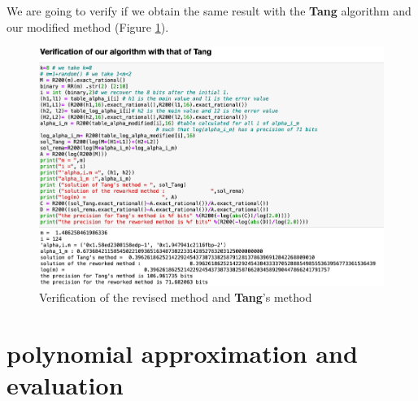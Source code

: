 We are going to verify if we obtain the same result with the \textbf{Tang} algorithm and our modified method (Figure \ref{fig:met_tang-gal}).
\begin{figure}[H]
    \centering
    \includegraphics[scale = 0.46]{images/notre_met_Tang_Gal/algo_remanie.png}
    \caption{Verification of the revised method and \textbf{Tang}'s method}\label{fig:met_tang-gal}
\end{figure}

\section{polynomial approximation and evaluation}

